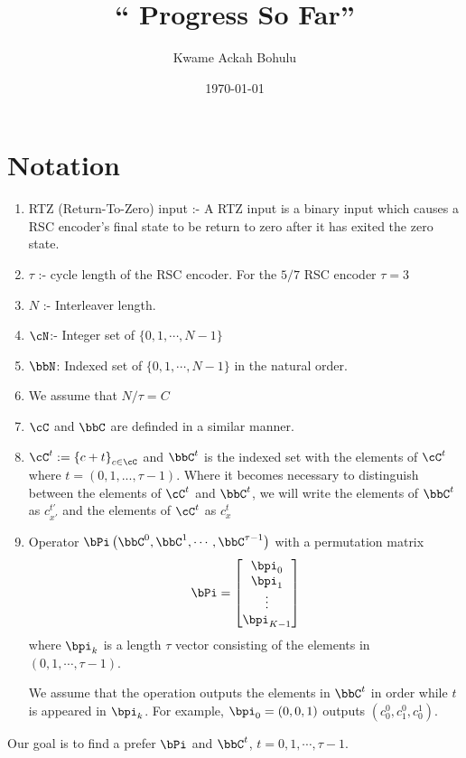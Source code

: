 \documentclass[11pt, oneside, dvipdfmx]{book}
\title{``
Progress So Far'' }
\author{Kwame Ackah Bohulu}
\date{\today}
\begin{document}
\maketitle
\section{Notation}
\begin{enumerate}
\item RTZ (Return-To-Zero) input :- A RTZ input is a binary input which causes a RSC encoder's final state to be return to zero after it has exited the zero state.

\item $\tau$ :- cycle length of the RSC encoder. For the $5/7$ RSC encoder $\tau = 3$

\item $N$ :- Interleaver length. 

\item $\cN$:- Integer set of $\{0,1,\cdots,N-1\}$

\item $\bbN$: Indexed set  of $\{0,1,\cdots,N-1\}$ in the natural order.

\item We assume that $N/\tau=C$

\item $\cC$ and $\bbC$ are definded in a similar manner.

\item $\cC^{t}:=\left\{c+t\right\}_{c \in \cC}$ and $\bbC^t$ is the indexed set with the elements of $\cC^t$ where  $t=(0,1,...,\tau-1)$. Where it becomes necessary to distinguish between the elements of $\cC^{t}$ and $\bbC^{t}$, we will write the elements of $\bbC^{t}$ as $c_{x'}^{t'}$ and the elements of $\cC^{t}$ as $c_x^{t}$

\item Operator $\bPi\left(\bbC^0,\bbC^1,\cdots,\bbC^{\tau-1}\right)$ with a permutation matrix
\[
\bPi = \begin{bmatrix}
\bpi_0\cr
\bpi_1\cr
\vdots\cr
\bpi_{K-1}
\end{bmatrix}
\]
where $\bpi_k$ is a length $\tau$ vector consisting of the elements in $(0,1,\cdots,\tau-1)$. 

We assume that the operation outputs the elements in $\bbC^t$ in order while $t$ is appeared in $\bpi_k$. For example, $\bpi_0 = (0,0,1)$ outputs $(c_0^0,c_1^0,c_0^1)$.
\end{enumerate}

Our goal is to find a prefer $\bPi$ and $\bbC^t$, $t = 0,1,\cdots,\tau-1$.
\end{document}
